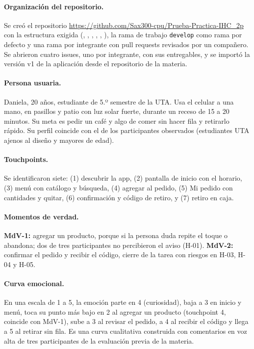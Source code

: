 \paragraph{Organización del repositorio.} Se creó el repositorio \url{https://github.com/Sax300-cpu/Prueba-Practica-IHC_2p} con la estructura exigida (, , , , , ), la rama de trabajo \texttt{develop} como rama por defecto y una rama por integrante con pull requests revisados por un compañero. Se abrieron cuatro issues, uno por integrante, con sus entregables, y se importó la versión v1 de la aplicación desde el repositorio de la materia.

\paragraph{Persona usuaria.} Daniela, 20 años, estudiante de 5.º semestre de la UTA. Usa el celular a una mano, en pasillos y patio con luz solar fuerte, durante un receso de 15 a 20 minutos. Su meta es pedir un café y algo de comer sin hacer fila y retirarlo rápido. Su perfil coincide con el de los participantes observados (estudiantes UTA ajenos al diseño y mayores de edad).

\paragraph{Touchpoints.} Se identificaron siete: (1) descubrir la app, (2) pantalla de inicio con el horario, (3) menú con catálogo y búsqueda, (4) agregar al pedido, (5) Mi pedido con cantidades y quitar, (6) confirmación y código de retiro, y (7) retiro en caja.

\paragraph{Momentos de verdad.} \textbf{MdV-1:} agregar un producto, porque si la persona duda repite el toque o abandona; dos de tres participantes no percibieron el aviso (H-01). \textbf{MdV-2:} confirmar el pedido y recibir el código, cierre de la tarea con riesgos en H-03, H-04 y H-05.

\paragraph{Curva emocional.} En una escala de 1 a 5, la emoción parte en 4 (curiosidad), baja a 3 en inicio y menú, toca su punto más bajo en 2 al agregar un producto (touchpoint 4, coincide con MdV-1), sube a 3 al revisar el pedido, a 4 al recibir el código y llega a 5 al retirar sin fila. Es una curva cualitativa construida con comentarios en voz alta de tres participantes de la evaluación previa de la materia.

